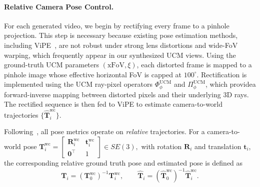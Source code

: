 \paragraph{Relative Camera Pose Control.}

For each generated video, we begin by rectifying every frame to a pinhole projection.  
This step is necessary because existing pose estimation methods, including ViPE~\cite{huang2025vipe}, are not robust under strong lens distortions and wide-FoV warping, which frequently appear in our synthesized UCM views.
Using the ground-truth UCM parameters \((\mathrm{xFoV}, \xi)\), each distorted frame is mapped to a pinhole image whose effective horizontal FoV is capped at \(100^\circ\).
Rectification is implemented using the UCM ray-pixel operators \(\Phi^{\mathrm{UCM}}_{\phi}\) and \(\Pi^{\mathrm{UCM}}_{\phi}\), which providea forward-inverse mapping between distorted pixels and their underlying 3D
rays.
The rectified sequence is then fed to ViPE to estimate camera-to-world trajectories \(\{\hat{\mathbf{T}}^{\mathrm{wc}}_i\}\).

Following~\cite{he2024cameractrl, wang2024motionctrl}, all pose metrics operate on \emph{relative} trajectories.  
For a camera-to-world pose
\(
\mathbf{T}^{\mathrm{wc}}_i
=
\left[
\begin{smallmatrix}
\mathbf{R}^{\mathrm{wc}}_i & \mathbf{t}^{\mathrm{wc}}_i \\
\mathbf{0}^\top & 1
\end{smallmatrix}
\right]
\in SE(3),
\)
with rotation \(\mathbf{R}_i\) and translation \(\mathbf{t}_i\), the corresponding relative ground truth pose and estimated pose is defined as
\begin{equation}
\mathbf{T}_i
=
(\mathbf{T}^{\mathrm{wc}}_0)^{-1}
\mathbf{T}^{\mathrm{wc}}_i,
\qquad
\hat{\mathbf{T}}_i
=
(\hat{\mathbf{T}}^{\mathrm{wc}}_0)^{-1}
\hat{\mathbf{T}}^{\mathrm{wc}}_i.
\end{equation}

